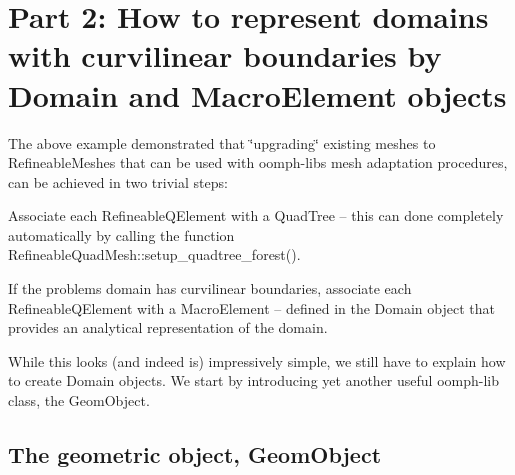 \hypertarget{index_domain}{}\section{Part 2\+: How to represent domains with curvilinear boundaries by Domain and Macro\+Element objects}\label{index_domain}
The above example demonstrated that \char`\"{}upgrading\char`\"{} existing meshes to {\ttfamily Refineable\+Meshes} that can be used with {\ttfamily oomph-\/lib\textquotesingle{}s} mesh adaptation procedures, can be achieved in two trivial steps\+:
\begin{DoxyEnumerate}
\item Associate each {\ttfamily Refineable\+Q\+Element} with a {\ttfamily Quad\+Tree} -- this can done completely automatically by calling the function {\ttfamily Refineable\+Quad\+Mesh\+::setup\+\_\+quadtree\+\_\+forest()}.
\item If the problem\textquotesingle{}s domain has curvilinear boundaries, associate each {\ttfamily Refineable\+Q\+Element} with a {\ttfamily Macro\+Element} -- defined in the {\ttfamily Domain} object that provides an analytical representation of the domain.
\end{DoxyEnumerate}While this looks (and indeed is) impressively simple, we still have to explain how to create {\ttfamily Domain} objects. We start by introducing yet another useful {\ttfamily oomph-\/lib} class, the {\ttfamily Geom\+Object}.\hypertarget{index_geom_object}{}\subsection{The geometric object, Geom\+Object}\label{index_geom_object}
